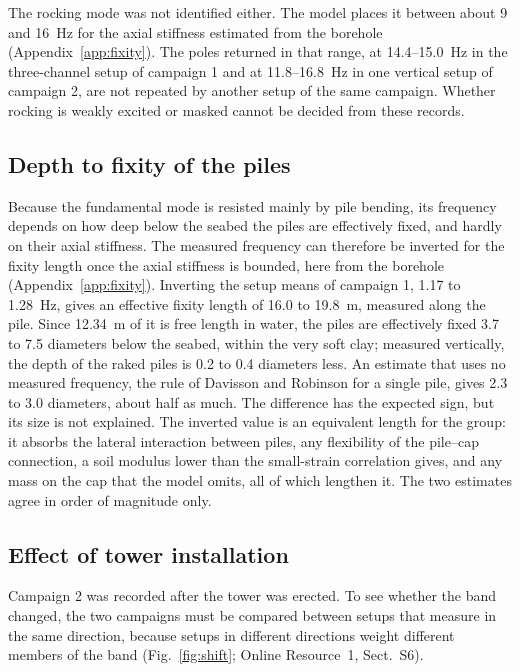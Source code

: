 \documentclass[11pt]{article}
\begin{document}
The rocking mode was not identified either. The model places it between about 9 and 16~Hz for the axial stiffness estimated from the borehole (Appendix~\ref{app:fixity}). The poles returned in that range, at 14.4--15.0~Hz in the three-channel setup of campaign 1 and at 11.8--16.8~Hz in one vertical setup of campaign 2, are not repeated by another setup of the same campaign. Whether rocking is weakly excited or masked cannot be decided from these records.

\subsection{Depth to fixity of the piles}
\label{sec:stiffness}

Because the fundamental mode is resisted mainly by pile bending, its frequency depends on how deep below the seabed the piles are effectively fixed, and hardly on their axial stiffness. The measured frequency can therefore be inverted for the fixity length once the axial stiffness is bounded, here from the borehole (Appendix~\ref{app:fixity}). Inverting the setup means of campaign 1, 1.17 to 1.28~Hz, gives an effective fixity length of 16.0 to 19.8~m, measured along the pile. Since 12.34~m of it is free length in water, the piles are effectively fixed 3.7 to 7.5 diameters below the seabed, within the very soft clay; measured vertically, the depth of the raked piles is 0.2 to 0.4 diameters less. An estimate that uses no measured frequency, the rule of Davisson and Robinson \cite{davisson1965} for a single pile, gives 2.3 to 3.0 diameters, about half as much. The difference has the expected sign, but its size is not explained. The inverted value is an equivalent length for the group: it absorbs the lateral interaction between piles, any flexibility of the pile--cap connection, a soil modulus lower than the small-strain correlation gives, and any mass on the cap that the model omits, all of which lengthen it. The two estimates agree in order of magnitude only.

\subsection{Effect of tower installation}
\label{sec:tower}

Campaign 2 was recorded after the tower was erected. To see whether the band changed, the two campaigns must be compared between setups that measure in the same direction, because setups in different directions weight different members of the band (Fig.~\ref{fig:shift}; Online Resource~1, Sect.~S6).
\end{document}

